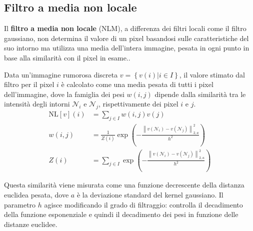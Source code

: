 \documentclass[../main.tex]{subfiles}
\begin{document}
\subsection{Filtro a media non locale}

Il \textbf{filtro a media non locale} (NLM), a differenza dei filtri locali come il filtro gaussiano, non determina il valore di un pixel basandosi sulle caratteristiche del suo intorno ma utilizza una media dell'intera immagine, pesata in ogni punto in base alla similarità con il pixel in esame.\cite{buades_2011}.

Data un'immagine rumorosa discreta $v = \left\{v(i) | i\in I\right\}$, il valore stimato dal filtro per il pixel $i$ è calcolato come una media pesata di tutti i pixel dell'immagine, dove la famiglia dei pesi $w(i,j)$ dipende dalla similarità tra le intensità degli intorni $\mathcal{N}_i$ e $\mathcal{N}_j$, rispettivamente dei pixel $i$ e $j$.
\begin{align}
	\text{NL}[v](i) &= \sum_{j\in I}w(i,j)v(j)\\
	w(i,j) &= \frac{1}{Z(i)}\exp\left(-\frac{\left\lVert v(\mathcal{N}_i) - v(\mathcal{N}_j) \right\lVert^2_{2,a}}{h^2}\right)\\
	Z(i) &= \sum_{j\in I}\exp\left(-\frac{\left\lVert v(\mathcal{N}_i) - v(\mathcal{N}_j) \right\lVert^2_{2,a}}{h^2}\right)
\end{align}

Questa similarità viene misurata come una funzione decrescente della distanza euclidea pesata, dove $a$ è la deviazione standard del kernel gaussiano. Il parametro $h$ agisce modificando il grado di filtraggio: controlla il decadimento della funzione esponenziale e quindi il decadimento dei pesi in funzione delle distanze euclidee.\cite{buades_2005}\\
\end{document}
